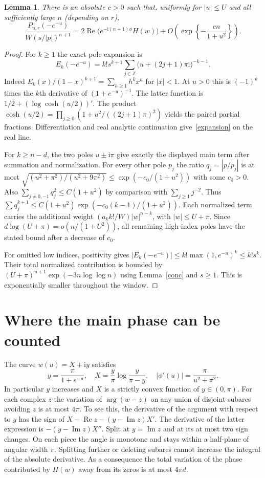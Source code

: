 \documentclass[11pt]{article}
\newtheorem{lemma}[theorem]{Lemma}
\newcommand{\ii}{\mathrm{i}}
\begin{document}
\begin{lemma}\label{poles}
There is an absolute $c>0$ such that, uniformly for $|u|\le U$ and all sufficiently large $n$ (depending on $r$),
\[
 \frac{P_{n,r}(-e^{-u})}{W(s/|p|)^{n+1}}
 =2\operatorname{Re}\big(e^{-\ii(n+1)\phi}H(w)\big)
    +O\!\left(\exp\left\{-\frac{cn}{1+u^2}\right\}\right).
\]
\end{lemma}
\begin{proof}
For $k\ge1$ the exact pole expansion is
\begin{equation}\label{expansion}
 E_k(-e^{-u})=k!s^{k+1}\sum_{j\in\mathbb Z}\big(u+(2j+1)\pi\ii\big)^{-k-1} .
\end{equation}
Indeed $E_k(x)/(1-x)^{k+1}=\sum_{h\ge1}h^kx^h$ for $|x|<1$. At $u>0$ this is $(-1)^k$ times the $k$th derivative of $(1+e^{-u})^{-1}$. The latter function is $1/2+(\log\cosh(u/2))'$. The product $\cosh(u/2)=\prod_{j\ge0}(1+u^2/((2j+1)\pi)^2)$ yields the paired partial fractions. Differentiation and real analytic continuation give~\eqref{expansion} on the real line.

For $k\ge n-d$, the two poles $u\pm\ii\pi$ give exactly the displayed main term after summation and normalization. For every other pole $p_j$ the ratio $q_j=|p/p_j|$ is at most $\sqrt{(u^2+\pi^2)/(u^2+9\pi^2)}\le \exp(-c_0/(1+u^2))$ with some $c_0>0$. Also $\sum_{j\ne0,-1}q_j^2\le C(1+u^2)$ by comparison with $\sum_{j\ge1}j^{-2}$. Thus $\sum q_j^{k+1}\le C(1+u^2)\exp(-c_0(k-1)/(1+u^2))$. Each normalized term carries the additional weight $(a_k k!/W)|w|^{n-k}$, with $|w|\le U+\pi$. Since $d\log(U+\pi)=o(n/(1+U^2))$, all remaining high-index poles have the stated bound after a decrease of $c_0$.

For omitted low indices, positivity gives $|E_k(-e^{-u})|\le k!\max(1,e^{-u})^k\le k!s^k$. Their total normalized contribution is bounded by $(U+\pi)^{n+1}\exp(-3n\log\log n)$ using Lemma~\ref{conc} and $s\ge1$. This is exponentially smaller throughout the window.\end{proof}

\section{Where the main phase can be counted}
The curve $w(u)=X+\ii y$ satisfies
\[
 y=\frac{\pi}{1+e^{-u}},\quad X=\frac y\pi\log\frac{y}{\pi-y},
 \quad |\phi'(u)|=\frac{\pi}{u^2+\pi^2} .
\]
In particular $y$ increases and $X$ is a strictly convex function of $y\in(0,\pi)$. For each complex $z$ the variation of $\arg(w-z)$ on any union of disjoint subarcs avoiding $z$ is at most $4\pi$. To see this, the derivative of the argument with respect to $y$ has the sign of $X-\operatorname{Re} z-(y-\operatorname{Im}z)X'$. The derivative of the latter expression is $-(y-\operatorname{Im}z)X''$. Split at $y=\operatorname{Im} z$ and at its at most two sign changes. On each piece the angle is monotone and stays within a half-plane of angular width $\pi$. Splitting further or deleting subarcs cannot increase the integral of the absolute derivative. As a consequence the total variation of the phase contributed by $H(w)$ away from its zeros is at most $4\pi d$.
\end{document}
